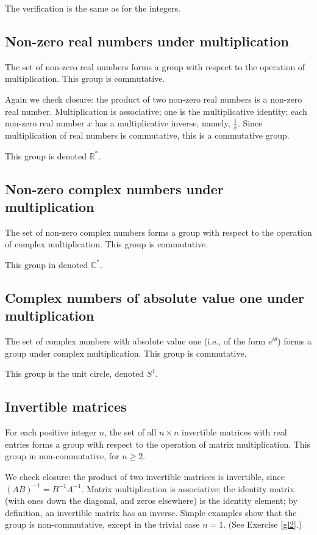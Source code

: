 \documentclass{amsbook}
\theoremstyle{plain}
\numberwithin{equation}{chapter}
\numberwithin{theorem}{chapter}
\begin{document}
The verification is the same as for the integers.

\subsection{Non-zero real numbers under multiplication}

The set of non-zero real numbers forms a group with respect to the operation
of multiplication. This group is commutative.

Again we check closure: the product of two non-zero real numbers is a non-zero
real number. Multiplication is associative; one is the multiplicative
identity; each non-zero real number $x$ has a multiplicative inverse, namely,
$\frac{1}{x}$. Since multiplication of real numbers is commutative, this is a
commutative group.

This group is denoted $\mathbb{R}^{*}$.

\subsection{Non-zero complex numbers under multiplication}

The set of non-zero complex numbers forms a group with respect to the
operation of complex multiplication. This group is commutative.

This group in denoted $\mathbb{C}^{*}$.

\subsection{Complex numbers of absolute value one under multiplication}

The set of complex numbers with absolute value one (i.e., of the form
$e^{i\theta}$) forms a group under complex multiplication. This group is commutative.

This group is the unit circle, denoted $S^{1}$.

\subsection{Invertible matrices}

For each positive integer $n$, the set of all $n\times n$ invertible matrices
with real entries forms a group with respect to the operation of matrix
multiplication. This group in non-commutative, for $n\geq2$.

We check closure: the product of two invertible matrices is invertible, since
$\left(  AB\right)  ^{-1}=B^{-1}A^{-1}$. Matrix multiplication is associative;
the identity matrix (with ones down the diagonal, and zeros elsewhere) is the
identity element; by definition, an invertible matrix has an inverse. Simple
examples show that the group is non-commutative, except in the trivial case
$n=1$. (See Exercise \ref{gl2}.)
\end{document}

